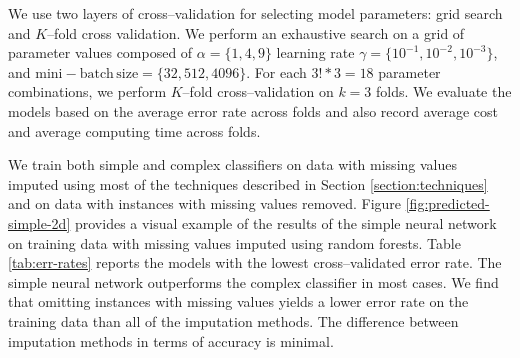 \documentclass[10pt,twocolumn,letterpaper]{article}
\begin{document}
We use two layers of cross--validation for selecting model parameters: grid search and $K$--fold cross validation. We perform an exhaustive search on a grid of parameter values composed of $\alpha = \{1,4,9\}$ learning rate $\gamma = \{10^{-1}, 10^{-2}, 10^{-3}\}$, and $\mathrm{mini-batch\, size} = \{32, 512, 4096\}$. For each $3!*3 = 18$ parameter combinations, we perform $K$--fold cross--validation on $k=3$ folds. We evaluate the models based on the average error rate across folds and also record average cost and average computing time across folds.  

We train both simple and complex classifiers on data with missing values imputed using most of the techniques described in Section \ref{section:techniques} and on data with instances with missing values removed. Figure \ref{fig:predicted-simple-2d} provides a visual example of the results of the simple neural network on training data with missing values imputed using random forests. Table \ref{tab:err-rates} reports the models with the lowest cross--validated error rate. The simple neural network outperforms the complex classifier in most cases. We find that omitting instances with missing values yields a lower error rate on the training data than all of the imputation methods. The difference between imputation methods in terms of accuracy is minimal. 
\end{document}
